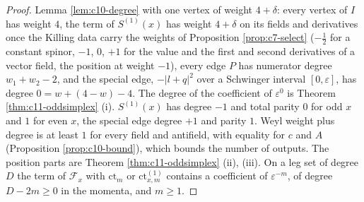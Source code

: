 \begin{proof}
Lemma \ref{lem:c10-degree} with one vertex of weight $4+\delta$: every vertex of $I$ has weight $4$, the term of $S^{(1)}(x)$ has weight $4+\delta$ on its fields and derivatives once the Killing data carry the weights of Proposition \ref{prop:c7-select} ($-\tfrac12$ for a constant spinor, $-1$, $0$, $+1$ for the value and the first and second derivatives of a vector field, the position at weight $-1$), every edge $P$ has numerator degree $w_1+w_2-2$, and the special edge, $-|l+q|^2$ over a Schwinger interval $[0,\varepsilon]$, has degree $0=w+(4-w)-4$. The degree of the coefficient of $\varepsilon^0$ is Theorem \ref{thm:c11-oddsimplex} (i). $S^{(1)}(x)$ has degree $-1$ and total parity $0$ for odd $x$ and $1$ for even $x$, the special edge degree $+1$ and parity $1$. Weyl weight plus degree is at least $1$ for every field and antifield, with equality for $c$ and $A$ (Proposition \ref{prop:c10-bound}), which bounds the number of outputs. The position parts are Theorem \ref{thm:c11-oddsimplex} (ii), (iii). On a leg set of degree $D$ the term of $\mathcal F_x$ with $\mathrm{ct}_m$ or $\mathrm{ct}^{(1)}_{x,m}$ contains a coefficient of $\varepsilon^{-m}$, of degree $D-2m\ge0$ in the momenta, and $m\ge1$.
\end{proof}

